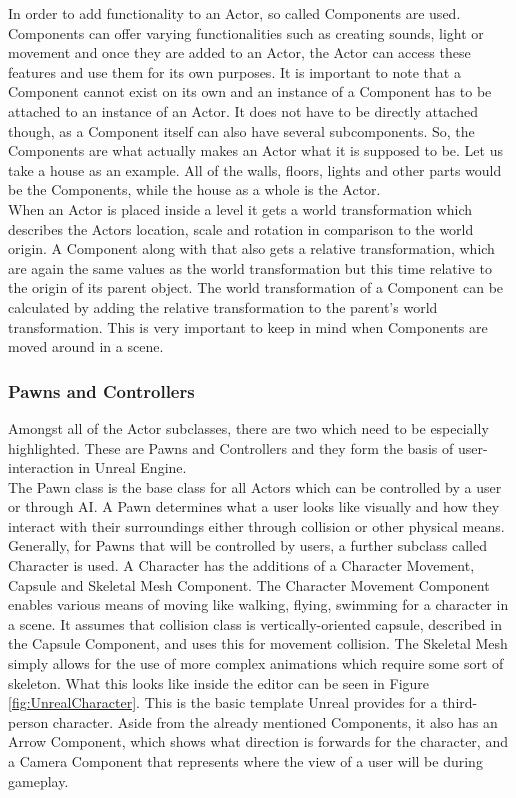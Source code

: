 In order to add functionality to an Actor, so called Components are used\cite{bib:UEComponents}. Components can offer varying functionalities such as creating sounds, light or movement and once they are added to an Actor, the Actor can access these features and use them for its own purposes. It is important to note that a Component cannot exist on its own and an instance of a Component has to be attached to an instance of an Actor. It does not have to be directly attached though, as a Component itself can also have several subcomponents. So, the Components are what actually makes an Actor what it is supposed to be. Let us take a house as an example. All of the walls, floors, lights and other parts would be the Components, while the house as a whole is the Actor.\\

When an Actor is placed inside a level it gets a world transformation which describes the Actors location, scale and rotation in comparison to the world origin. A Component along with that also gets a relative transformation, which are again the same values as the world transformation but this time relative to the origin of its parent object. The world transformation of a Component can be calculated by adding the relative transformation to the parent's world transformation. This is very important to keep in mind when Components are moved around in a scene. 

\subsubsection{Pawns and Controllers}
Amongst all of the Actor subclasses, there are two which need to be especially highlighted. These are Pawns and Controllers and they form the basis of user-interaction in Unreal Engine.\\
The Pawn class is the base class for all Actors which can be controlled by a user or through \acs{AI}\cite{bib:UEPawn}. A Pawn determines what a user looks like visually and how they interact with their surroundings either through collision or other physical means. Generally, for Pawns that will be controlled by users, a further subclass called Character is used\cite{bib:UECharacter}. A Character has the additions of a Character Movement, Capsule and Skeletal Mesh Component. The Character Movement Component enables various means of moving like walking, flying, swimming for a character in a scene. It assumes that collision class is vertically-oriented capsule, described in the Capsule Component, and uses this for movement collision. The Skeletal Mesh simply allows for the use of more complex animations which require some sort of skeleton. What this looks like inside the editor can be seen in Figure \ref{fig:UnrealCharacter}. This is the basic template Unreal provides for a third-person character. Aside from the already mentioned Components, it also has an Arrow Component, which shows what direction is forwards for the character, and a Camera Component that represents where the view of a user will be during gameplay.\\

